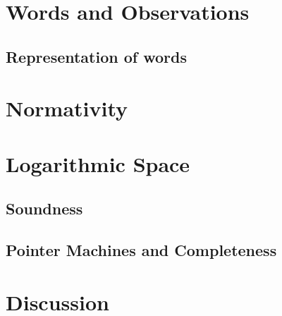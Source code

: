 \section{Words and Observations}\label{sec_words}
	\subsection{Representation of words}
	
	
	
\section{Normativity}\label{sec_normativity}
	

\section{Logarithmic Space}\label{sec_logspace}
	\subsection{Soundness}
	
	\subsection{Pointer Machines and Completeness}
	

\section*{Discussion}




